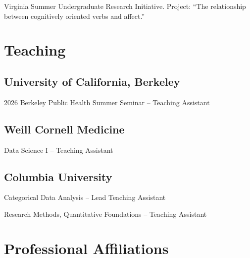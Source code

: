 \documentclass[12pt,letterpaper]{report}
\newcommand{\listitemspace}{0.15em}
\renewenvironment{itemize}
{\begin{list}{}{\setlength{\leftmargin}{0em}
            \setlength{\parskip}{0em}
            \setlength{\itemsep}{\listitemspace}
            \setlength{\parsep}{\listitemspace}}}
    {\end{list}}
\begin{document}
    \begin{tablist}

        \item[2015] \tab Virginia Summer Undergraduate Research Initiative. Project: \enquote{The relationship between cognitively oriented verbs and affect.}

    \end{tablist}

    \section*{Teaching}
    
    \subsection*{University of California, Berkeley}
    
    \begin{itemize}
    
    	\item 2026 Berkeley Public Health Summer Seminar -- Teaching Assistant
    
    \end{itemize}
    
    \subsection*{Weill Cornell Medicine}
    
    \begin{itemize}
    
    	\item Data Science I -- Teaching Assistant
    
    \end{itemize}

    \subsection*{Columbia University}
    
    \begin{itemize}
    	
    	\item Categorical Data Analysis -- Lead Teaching Assistant
    	\item Research Methods, Quantitative Foundations -- Teaching Assistant
    
    \end{itemize}

    \section*{Professional Affiliations}
\end{document}
